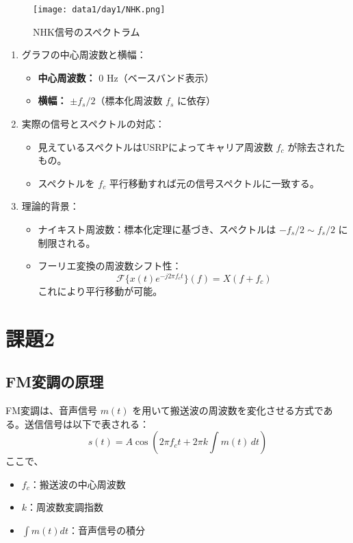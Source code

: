 \documentclass[a4paper, twocolumn]{article} %
\begin{document}
\begin{figure}[H]
    \centering
    \texttt{[image: data1/day1/NHK.png]}
    \caption{NHK信号のスペクトラム}
    \label{fig:nhk_spectrum}
\end{figure}
\begin{enumerate}
    \item グラフの中心周波数と横幅：
    \begin{itemize}
        \item \textbf{中心周波数：} 0 Hz（ベースバンド表示）
        \item \textbf{横幅：} \(\pm f_s/2\)（標本化周波数 \(f_s\) に依存）
    \end{itemize}
    \item 実際の信号とスペクトルの対応：
    \begin{itemize}
        \item 見えているスペクトルはUSRPによってキャリア周波数 \(f_c\) が除去されたもの。
        \item スペクトルを \(f_c\) 平行移動すれば元の信号スペクトルに一致する。
    \end{itemize}
    \item 理論的背景：
    \begin{itemize}
        \item ナイキスト周波数：標本化定理に基づき、スペクトルは \(-f_s/2 \sim f_s/2\) に制限される。
        \item フーリエ変換の周波数シフト性：
        \[
        \mathcal{F}\{x(t) e^{-j2\pi f_c t}\}(f) = X(f + f_c)
        \]
        これにより平行移動が可能。
    \end{itemize}
\end{enumerate}


\section{課題2}
\subsection*{FM変調の原理}
FM変調は、音声信号 \(m(t)\) を用いて搬送波の周波数を変化させる方式である。送信信号は以下で表される：
\[
s(t) = A \cos \left( 2 \pi f_c t + 2 \pi k \int m(t) \, dt \right)
\]
ここで、
\begin{itemize}
    \item \(f_c\)：搬送波の中心周波数
    \item \(k\)：周波数変調指数
    \item \(\int m(t) dt\)：音声信号の積分
\end{itemize}
\end{document}
